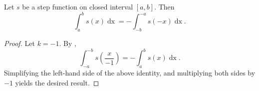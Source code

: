 \documentclass{report}
\begin{document}
\section{}%
\label{sec:step-reflection-property}

Let $s$ be a step function on closed interval $[a, b]$.
Then
  $$\int_a^b s(x) \mathop{dx} = - \int_{-b}^{-a} s(-x) \mathop{dx}.$$

\begin{proof}

  Let $k = -1$.
  By ,
    $$\int_{-a}^{-b} s \left( \frac{x}{-1} \right) =
      -\int_a^b s(x) \mathop{dx}.$$
  Simplifying the left-hand side of the above identity, and multiplying both
    sides by $-1$ yields the desired result.

\end{proof}
\end{document}
